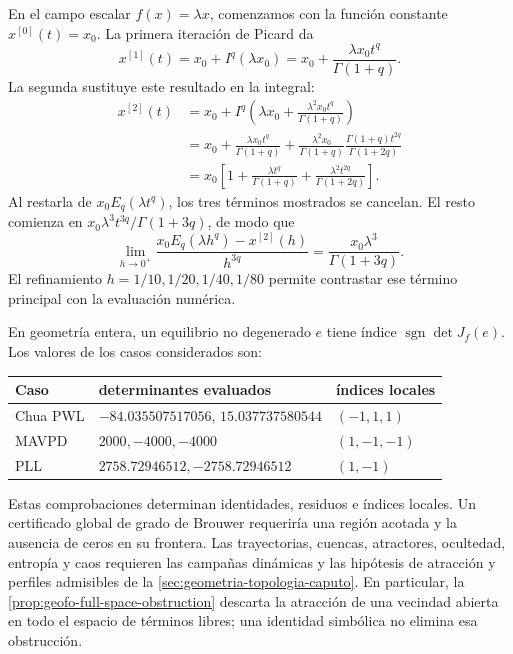 En el campo escalar \(f(x)=\lambda x\), comenzamos con la función
constante \(x^{[0]}(t)=x_0\). La primera iteración de Picard da
\[
 x^{[1]}(t)=x_0+I^q(\lambda x_0)
 =x_0+\frac{\lambda x_0t^q}{\Gamma(1+q)}.
\]
La segunda sustituye este resultado en la integral:
\begin{align*}
 x^{[2]}(t)
 &=x_0+I^q\!\left(\lambda x_0+
                  \frac{\lambda^2x_0t^q}{\Gamma(1+q)}\right)\\
 &=x_0+\frac{\lambda x_0t^q}{\Gamma(1+q)}
       +\frac{\lambda^2x_0}{\Gamma(1+q)}
         \frac{\Gamma(1+q)t^{2q}}{\Gamma(1+2q)}\\
 &=x_0\left[1+\frac{\lambda t^q}{\Gamma(1+q)}
               +\frac{\lambda^2t^{2q}}{\Gamma(1+2q)}\right].
\end{align*}
Al restarla de \(x_0E_q(\lambda t^q)\), los tres términos mostrados se
cancelan. El resto comienza en
\(x_0\lambda^3t^{3q}/\Gamma(1+3q)\), de modo que
\[
 \lim_{h\to0^+}\frac{x_0E_q(\lambda h^q)-x^{[2]}(h)}{h^{3q}}
 =\frac{x_0\lambda^3}{\Gamma(1+3q)}.
\]
El refinamiento \(h=1/10,1/20,1/40,1/80\) permite contrastar ese término
principal con la evaluación numérica.

En geometría entera, un equilibrio no degenerado \(e\) tiene índice
\(\operatorname{sgn}\det J_f(e)\). Los valores de los casos considerados son:
\begin{center}
\begin{tabular}{@{}lll@{}}
\toprule
Caso & determinantes evaluados & índices locales \\
\midrule
Chua PWL & \(-84.035507517056\), \(15.037737580544\)
 & \((-1,1,1)\)\\
MAVPD & \(2000,-4000,-4000\) & \((1,-1,-1)\)\\
PLL & \(2758.72946512,-2758.72946512\) & \((1,-1)\)\\
\bottomrule
\end{tabular}
\end{center}

Estas comprobaciones determinan identidades, residuos e índices locales. Un
certificado global de grado de Brouwer requeriría una región acotada y la
ausencia de ceros en su frontera. Las trayectorias, cuencas, atractores,
ocultedad, entropía y caos requieren las campañas dinámicas y las hipótesis de
atracción y perfiles admisibles de la \cref{sec:geometria-topologia-caputo}.
En particular, la \cref{prop:geofo-full-space-obstruction} descarta la
atracción de una vecindad abierta en todo el espacio de términos libres; una
identidad simbólica no elimina esa obstrucción.

